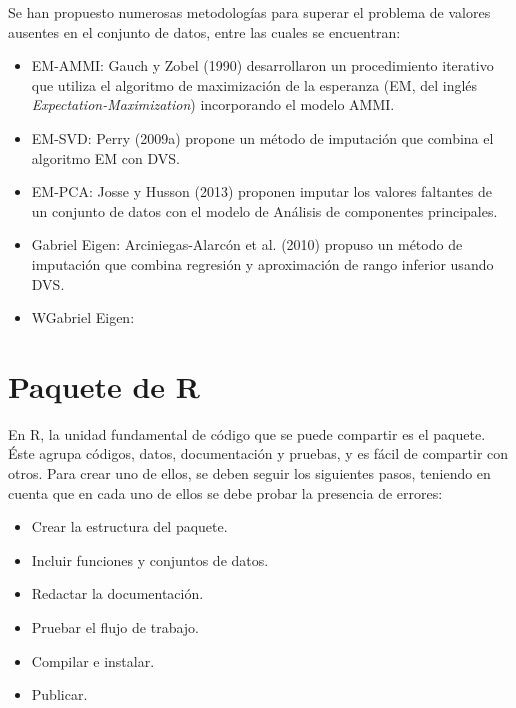 Se han propuesto numerosas metodologías para superar el problema de valores ausentes en el conjunto de datos, entre las cuales se encuentran:

\begin{itemize}
\item EM-AMMI: Gauch y Zobel (1990) desarrollaron un procedimiento iterativo que utiliza el algoritmo de maximización de la esperanza (EM, del inglés \emph{Expectation-Maximization}) incorporando el modelo AMMI. 
\end{itemize}
\begin{itemize}
\item EM-SVD: Perry (2009a) propone un método de imputación que combina el algoritmo EM con DVS. 
\end{itemize}
\begin{itemize}
\item EM-PCA: Josse y Husson (2013) proponen imputar los valores faltantes de un conjunto de datos con el modelo de Análisis de componentes principales.
\end{itemize}
\begin{itemize}
\item Gabriel Eigen: Arciniegas-Alarcón et al. (2010) propuso un método de imputación que combina regresión y aproximación de rango inferior usando DVS. 
\end{itemize}
\begin{itemize}
\item WGabriel Eigen:
\end{itemize}




\section{Paquete de R}

En R, la unidad fundamental de código que se puede compartir es el paquete. Éste agrupa códigos, datos, documentación y pruebas, y es fácil de compartir con otros. Para crear uno de ellos, se deben seguir los siguientes pasos, teniendo en cuenta que en cada uno de ellos se debe probar la presencia de errores:

\begin{itemize}
\item Crear la estructura del paquete.
\item Incluir funciones y conjuntos de datos.
\item Redactar la documentación.
\item Pruebar el flujo de trabajo.
\item Compilar e instalar.
\item Publicar.
\end{itemize}


